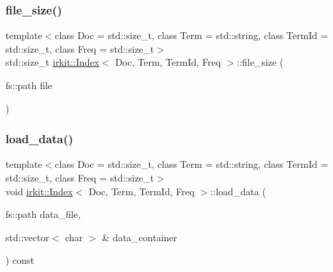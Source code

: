 \mbox{\label{classirkit_1_1Index_a47d88bb03c2c547fc159739b13871f68}} 
\subsubsection{\texorpdfstring{file\+\_\+size()}{file\_size()}}
{\footnotesize\ttfamily template$<$class Doc  = std\+::size\+\_\+t, class Term  = std\+::string, class Term\+Id  = std\+::size\+\_\+t, class Freq  = std\+::size\+\_\+t$>$ \\
std\+::size\+\_\+t \mbox{\hyperlink{classirkit_1_1Index}{irkit\+::\+Index}}$<$ Doc, Term, Term\+Id, Freq $>$\+::file\+\_\+size (\begin{DoxyParamCaption}\item[{fs\+::path}]{file }\end{DoxyParamCaption})\hspace{0.3cm}{\ttfamily [inline]}}

\mbox{\label{classirkit_1_1Index_acdc1ba811044619795c2ab7eeed13abc}} 
\subsubsection{\texorpdfstring{load\+\_\+data()}{load\_data()}\hspace{0.1cm}{\footnotesize\ttfamily [1/2]}}
{\footnotesize\ttfamily template$<$class Doc  = std\+::size\+\_\+t, class Term  = std\+::string, class Term\+Id  = std\+::size\+\_\+t, class Freq  = std\+::size\+\_\+t$>$ \\
void \mbox{\hyperlink{classirkit_1_1Index}{irkit\+::\+Index}}$<$ Doc, Term, Term\+Id, Freq $>$\+::load\+\_\+data (\begin{DoxyParamCaption}\item[{fs\+::path}]{data\+\_\+file,  }\item[{std\+::vector$<$ char $>$ \&}]{data\+\_\+container }\end{DoxyParamCaption}) const\hspace{0.3cm}{\ttfamily [inline]}}

\mbox{\label{classirkit_1_1Index_a2dfd40f97f0022b075c8aaa38d96edc7}} 
